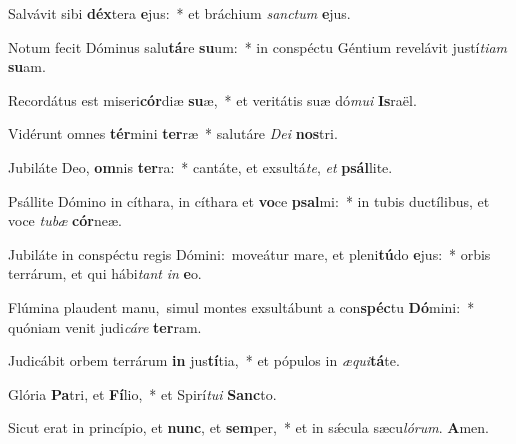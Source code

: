 \vs Salvávit sibi \textbf{déx}tera \textbf{e}jus:~* et bráchium \textit{sanc}\textit{tum} \textbf{e}jus.

\vs Notum fecit Dóminus salu\textbf{tá}re \textbf{su}um:~* in conspéctu Géntium revelávit justí\textit{ti}\textit{am} \textbf{su}am.

\vs Recordátus est miseri\textbf{cór}diæ \textbf{su}æ,~* et veritátis suæ dó\textit{mu}\textit{i} \textbf{Is}raël.

\vs Vidérunt omnes \textbf{tér}mini \textbf{ter}ræ~* salutáre \textit{De}\textit{i} \textbf{nos}tri.

\vs Jubiláte Deo, \textbf{om}nis \textbf{ter}ra:~* cantáte, et exsultá\textit{te}, \textit{et} \textbf{psál}lite.

\vs Psállite Dómino in cíthara, in cíthara et \textbf{vo}ce \textbf{psal}mi:~* in tubis ductílibus, et voce \textit{tu}\textit{bæ} \textbf{cór}neæ.

\vs Jubiláte in conspéctu regis Dómini:~\reddagger moveátur mare, et pleni\textbf{tú}do \textbf{e}jus:~* orbis terrárum, et qui hábi\textit{tant} \textit{in} \textbf{e}o.

\vs Flúmina plaudent manu,~\reddagger simul montes exsultábunt a con\textbf{spéc}tu \textbf{Dó}mini:~* quóniam venit judi\textit{cá}\textit{re} \textbf{ter}ram.

\vs Judicábit orbem terrárum \textbf{in} jus\textbf{tí}tia,~* et pópulos in \textit{æ}\textit{qui}\textbf{tá}te.

\vs Glória \textbf{Pa}tri, et \textbf{Fí}lio,~* et Spirí\textit{tu}\textit{i} \textbf{Sanc}to.

\vs Sicut erat in princípio, et \textbf{nunc}, et \textbf{sem}per,~* et in sǽcula sæcu\textit{ló}\textit{rum}. \textbf{A}men.
